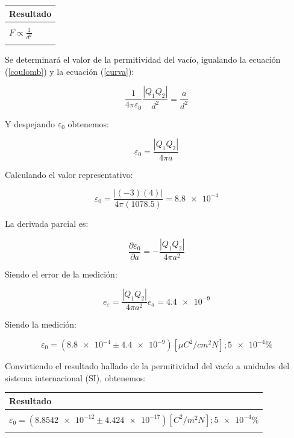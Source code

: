 \documentclass[letter,11pt]{article}
\begin{document}
\begin{center}
\begin{tabular}{|>{\centering}m{9.2cm}<{\centering}|}
\hline
\textbf{Resultado} 
\tabularnewline \hline
\\
\Large{$F \propto \frac{1}{d^2}$} \tabularnewline
\\
\hline
\end{tabular}
\end{center}

Se determinará el valor de la permitividad del vacío, igualando la ecuación
(\ref{coulomb}) y la ecuación (\ref{curva}):

\begin{equation*}
    \frac{1}{4 \pi \varepsilon_0} \frac{| Q_1 Q_2 |}{d^2} = \frac{a}{d^2}
\end{equation*}

Y despejando $\varepsilon_0$ obtenemos:

\begin{equation}
    \varepsilon_0 = \frac{| Q_1 Q_2 |}{4 \pi a}
\end{equation}

Calculando el valor representativo:

\begin{equation*}
    \varepsilon_0 = \frac{|(-3)(4)|}{4 \pi (1078.5)} = \num{8.8e-4}
\end{equation*}

La derivada parcial es:

\begin{equation*}
    \frac{\partial{\varepsilon_0}}{\partial{a}} = -\frac{|Q_1 Q_2|}{4 \pi a^2}
\end{equation*}

Siendo el error de la medición:

\begin{equation}
    e_\varepsilon = \frac{|Q_1 Q_2|}{4 \pi a^2} e_a = \num{4.4e-9}
\end{equation}

Siendo la medición:

\begin{equation*}
    \varepsilon_0 = (\num{8.8e-4} \pm \num{4.4e-9}) [\mu C^2/cm^2 N]; \num{5e-4} \%
\end{equation*}

Convirtiendo el resultado hallado de la permitividad del vacío a unidades del
sistema internacional (SI), obtenemos:

\begin{center}
\begin{tabular}{|>{\centering}m{11.0cm}<{\centering}|}
\hline
\textbf{Resultado}
\tabularnewline \hline
\\
$\varepsilon_0 = (\num{8.8542e-12} \pm \num{4.424e-17}) [C^2/m^2 N]; \num{5e-4} \%$ \tabularnewline
\\
\hline
\end{tabular}
\end{center}
\end{document}
